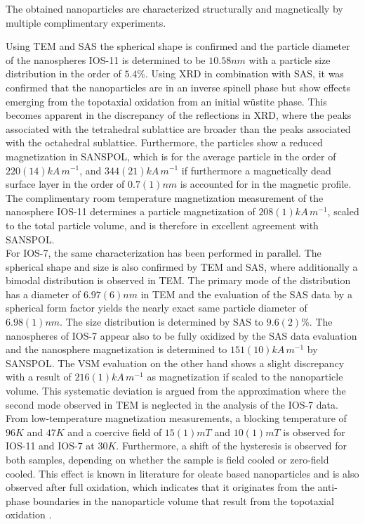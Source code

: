 \documentclass[\main/dresen_thesis.tex]{subfiles}
\begin{document}
  \label{sec:looselyPackedNS:nanoparticle:discussion:summary}
  The obtained nanoparticles are characterized structurally and magnetically by multiple complimentary experiments.

  Using TEM and SAS the spherical shape is confirmed and the particle diameter of the nanospheres IOS-11 is determined to be $10.58 \unit{nm}$  with a particle size distribution in the order of $5.4 \unit{\%}$.
  Using XRD in combination with SAS, it was confirmed that the nanoparticles are in an inverse spinell phase but show effects emerging from the topotaxial oxidation from an initial w\"ustite phase.
  This becomes apparent in the discrepancy of the reflections in XRD, where the peaks associated with the tetrahedral sublattice are broader than the peaks associated with the octahedral sublattice.
  Furthermore, the particles show a reduced magnetization in SANSPOL, which is for the average particle in the order of $220(14) \unit{kA \, m^{-1}}$, and $344(21) \unit{kA \, m^{-1}}$ if furthermore a magnetically dead surface layer in the order of $0.7(1) \unit{nm}$ is accounted for in the magnetic profile.
  The complimentary room temperature magnetization measurement of the nanosphere IOS-11 determines a particle magnetization of $208(1) \unit{kA \, m^{-1}}$, scaled to the total particle volume, and is therefore in excellent agreement with SANSPOL.
  \\

  For IOS-7, the same characterization has been performed in parallel.
  The spherical shape and size is also confirmed by TEM and SAS, where additionally a bimodal distribution is observed in TEM.
  The primary mode of the distribution has a diameter of $6.97(6) \unit{nm}$ in TEM and the evaluation of the SAS data by a spherical form factor yields the nearly exact same particle diameter of $6.98(1) \unit{nm}$.
  The size distribution is determined by SAS to $9.6(2) \unit{\%}$.
  The nanospheres of IOS-7 appear also to be fully oxidized by the SAS data evaluation and the nanosphere magnetization is determined to $151(10) \unit{kA \, m^{-1}}$ by SANSPOL.
  The VSM evaluation on the other hand shows a slight discrepancy with a result of $216(1) \unit{kA \, m^{-1}}$ as magnetization if scaled to the nanoparticle volume.
  This systematic deviation is argued from the approximation where the second mode observed in TEM is neglected in the analysis of the IOS-7 data.
  \\

  From low-temperature magnetization measurements, a blocking temperature of $96 \unit{K}$ and $47 \unit{K}$ and a coercive field of $15(1) \unit{mT}$ and $10(1) \unit{mT}$ is observed for IOS-11 and IOS-7 at $30 \unit{K}$.
  Furthermore, a shift of the hysteresis is observed for both samples, depending on whether the sample is field cooled or zero-field cooled.
  This effect is known in literature for oleate based nanoparticles and is also observed after full oxidation, which indicates that it originates from the anti-phase boundaries in the nanoparticle volume that result from the topotaxial oxidation \cite{Wetterskog_2013_Anoma}.
\end{document}
